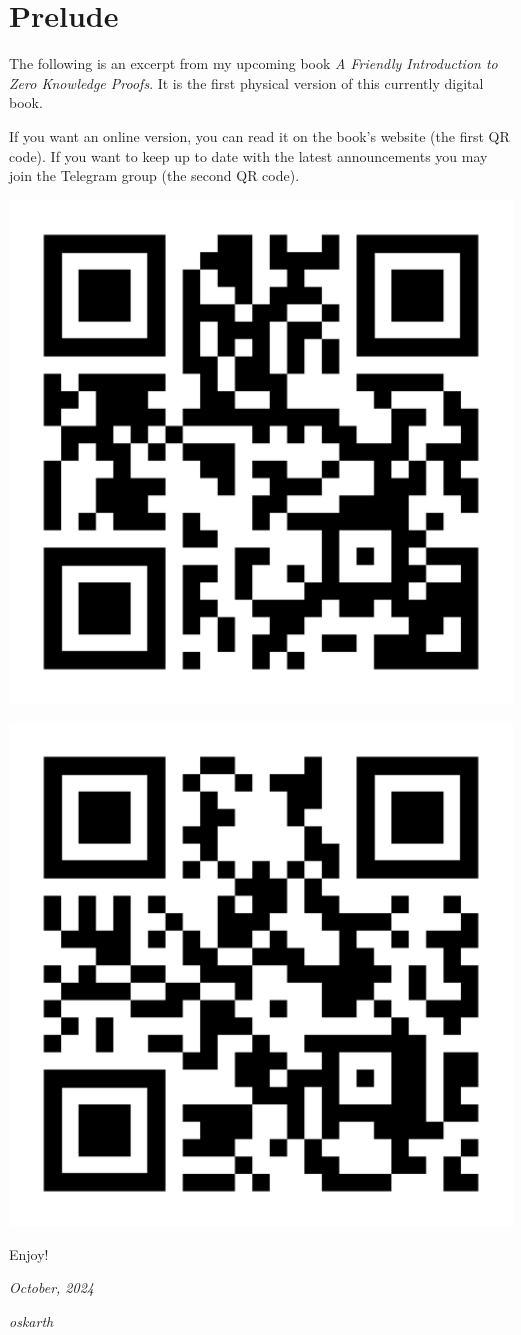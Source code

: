 \section*{Prelude}
\vspace{0.5cm}

The following is an excerpt from my upcoming book \textit{A Friendly Introduction to Zero Knowledge Proofs}. 
It is the first physical version of this currently digital book.

If you want an online version, you can read it on the book's website (the first QR code).
If you want to keep up to date with the latest announcements you may join the Telegram group (the second QR code).

\vspace{1cm}

\begin{center}
\includegraphics[width=0.3\linewidth]{content/assets/zkintro_website_qrcode.png}
\end{center}

\vspace{0.5cm}

\begin{center}
\includegraphics[width=0.3\linewidth]{content/assets/zkintro_tg_group_qrcode.png}
\end{center}

\vspace{0.5cm}

Enjoy!

\textit{October, 2024}

\textit{oskarth}

\thispagestyle{empty}